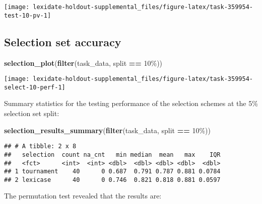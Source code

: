 \documentclass[
]{book}
\newenvironment{Shaded}{\begin{snugshade}}{\end{snugshade}}
\newcommand{\FunctionTok}[1]{\textcolor[rgb]{0.13,0.29,0.53}{\textbf{#1}}}
\newcommand{\NormalTok}[1]{#1}
\newcommand{\SpecialCharTok}[1]{\textcolor[rgb]{0.81,0.36,0.00}{\textbf{#1}}}
\newcommand{\StringTok}[1]{\textcolor[rgb]{0.31,0.60,0.02}{#1}}
\begin{document}
\texttt{[image: lexidate-holdout-supplemental\_files/figure-latex/task-359954-test-10-pv-1]}

\hypertarget{selection-set-accuracy-6}{%
\subsection{Selection set accuracy}\label{selection-set-accuracy-6}}

\begin{Shaded}
\begin{Highlighting}[]
\FunctionTok{selection\_plot}\NormalTok{(}\FunctionTok{filter}\NormalTok{(task\_data, split }\SpecialCharTok{==} \StringTok{\textquotesingle{}10\%\textquotesingle{}}\NormalTok{))}
\end{Highlighting}
\end{Shaded}

\texttt{[image: lexidate-holdout-supplemental\_files/figure-latex/task-359954-select-10-perf-1]}

Summary statistics for the testing performance of the selection schemes at the 5\% selection set split:

\begin{Shaded}
\begin{Highlighting}[]
\FunctionTok{selection\_results\_summary}\NormalTok{(}\FunctionTok{filter}\NormalTok{(task\_data, split }\SpecialCharTok{==} \StringTok{\textquotesingle{}10\%\textquotesingle{}}\NormalTok{))}
\end{Highlighting}
\end{Shaded}

\begin{verbatim}
## # A tibble: 2 x 8
##   selection  count na_cnt   min median  mean   max    IQR
##   <fct>      <int>  <int> <dbl>  <dbl> <dbl> <dbl>  <dbl>
## 1 tournament    40      0 0.687  0.791 0.787 0.881 0.0784
## 2 lexicase      40      0 0.746  0.821 0.818 0.881 0.0597
\end{verbatim}

The permutation test revealed that the results are:
\end{document}
